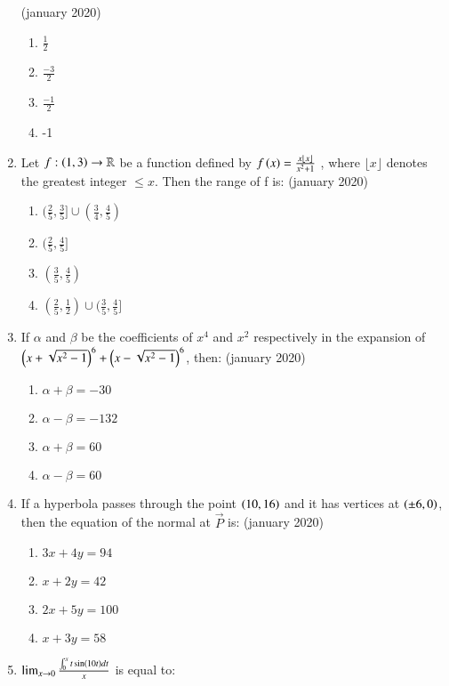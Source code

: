\documentclass[journal,12pt,onecolumn]{IEEEtran}
\theoremstyle{remark}
\begin{document}
\begin{enumerate}
	    \hfill{(january 2020)}
	    \begin{enumerate}
        \item $\frac{1}{2}$
        \item $\frac{-3}{2}$
        \item $\frac{-1}{2}$
        \item -1
    \end{enumerate}
    \item Let $f : \left(1,3\right) \rightarrow \mathbb{R}$ be a function defined by $f\left(x\right) = \frac{x\lfloor x \rfloor}{x^2+1}$ , where $\lfloor x \rfloor$ denotes the greatest integer $\leq x$. Then the range of f is:
	    \hfill{(january 2020)}
	    \begin{enumerate}
        \item $( \frac{2}{5} , \frac{3}{5} ] \cup ( \frac{3}{4} , \frac{4}{5} )$
        \item $( \frac{2}{5} , \frac{4}{5} ]$
        \item $( \frac{3}{5} , \frac{4}{5} )$
        \item $( \frac{2}{5} , \frac{1}{2} ) \cup ( \frac{3}{5} , \frac{4}{5} ]$
    \end{enumerate}
    \item If $\alpha$ and $\beta$ be the coefficients of $x^4$  and $x^2$ respectively in the expansion of $\left(x+\sqrt{x^2-1}\right)^6 + \left(x-\sqrt{x^2-1}\right)^6$, then:
    \hfill{(january 2020)}
	    \begin{enumerate}
        \item $\alpha + \beta = -30 $
        \item $\alpha - \beta = -132$
       \item $\alpha + \beta = 60 $
        \item $\alpha - \beta = 60$
    \end{enumerate}
    \item  If a hyperbola passes through the point $\left(10, 16\right)$ and it has vertices at $\left(\pm 6, 0\right)$, then the equation of the normal at $\vec{P}$ is:
    \hfill{(january 2020)}
		\begin{enumerate}
        \item $3x+4y=94$
        \item $x+2y=42$
        \item $2x+5y=100$
        \item $x+3y=58$
    \end{enumerate}
    \item $\lim_{x \to 0} \frac{\int^{x}_0 t\sin\left(10t\right)dt}{x}$ is equal to:

\end{enumerate}
\end{document}
